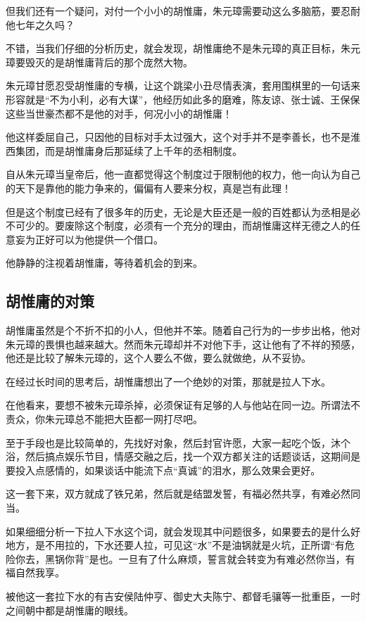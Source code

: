 \begin{multicols}{\theparacolNo}
		但我们还有一个疑问，对付一个小小的胡惟庸，朱元璋需要动这么多脑筋，要忍耐他七年之久吗？

		不错，当我们仔细的分析历史，就会发现，胡惟庸绝不是朱元璋的真正目标，朱元璋要毁灭的是胡惟庸背后的那个庞然大物。

		朱元璋甘愿忍受胡惟庸的专横，让这个跳梁小丑尽情表演，套用围棋里的一句话来形容就是“不为小利，必有大谋”，他经历如此多的磨难，陈友谅、张士诚、王保保这些当世豪杰都不是他的对手，何况小小的胡惟庸！

		他这样委屈自己，只因他的目标对手太过强大，这个对手并不是李善长，也不是淮西集团，而是胡惟庸身后那延续了上千年的丞相制度。

		自从朱元璋当皇帝后，他一直都觉得这个制度过于限制他的权力，他一向认为自己的天下是靠他的能力争来的，偏偏有人要来分权，真是岂有此理！

		但是这个制度已经有了很多年的历史，无论是大臣还是一般的百姓都认为丞相是必不可少的。要废除这个制度，必须有一个充分的理由，而胡惟庸这样无德之人的任意妄为正好可以为他提供一个借口。

		他静静的注视着胡惟庸，等待着机会的到来。

		\subsection{胡惟庸的对策}
		胡惟庸虽然是个不折不扣的小人，但他并不笨。随着自己行为的一步步出格，他对朱元璋的畏惧也越来越大。然而朱元璋却并不对他下手，这让他有了不祥的预感，他还是比较了解朱元璋的，这个人要么不做，要么就做绝，从不妥协。

		在经过长时间的思考后，胡惟庸想出了一个绝妙的对策，那就是拉人下水。

		在他看来，要想不被朱元璋杀掉，必须保证有足够的人与他站在同一边。所谓法不责众，你朱元璋总不能把大臣都一网打尽吧。

		至于手段也是比较简单的，先找好对象，然后封官许愿，大家一起吃个饭，沐个浴，然后搞点娱乐节目，情感交融之后，找一个双方都关注的话题谈话，这期间是要投入点感情的，如果谈话中能流下点“真诚”的泪水，那么效果会更好。

		这一套下来，双方就成了铁兄弟，然后就是结盟发誓，有福必然共享，有难必然同当。

		如果细细分析一下拉人下水这个词，就会发现其中问题很多，如果要去的是什么好地方，是不用拉的，下水还要人拉，可见这“水”不是油锅就是火坑，正所谓“有危险你去，黑锅你背”是也。一旦有了什么麻烦，誓言就会转变为有难必然你当，有福自然我享。

		被他这一套拉下水的有吉安侯陆仲亨、御史大夫陈宁、都督毛骧等一批重臣，一时之间朝中都是胡惟庸的眼线。


\end{multicols}
